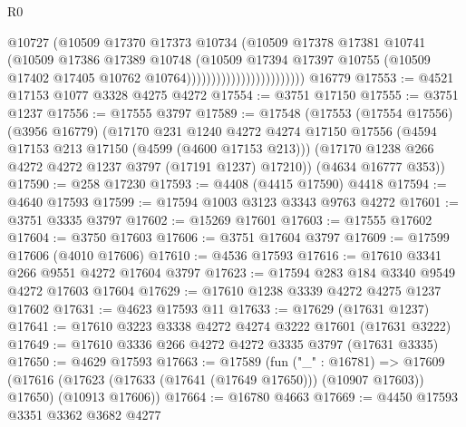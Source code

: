 \begin{lexlean}{R0}
\begin{coremodule}
                                          @10727
                                          (@10509
                                            @17370
                                            @17373
                                            @10734
                                            (@10509
                                              @17378
                                              @17381
                                              @10741
                                              (@10509
                                                @17386
                                                @17389
                                                @10748
                                                (@10509
                                                  @17394
                                                  @17397
                                                  @10755
                                                  (@10509
                                                    @17402
                                                    @17405
                                                    @10762
                                                    @10764))))))))))))))))))))))))
    @16779
@17553 := @4521 @17153 @1077 @3328 @4275 @4272
@17554 := @3751 @17150
@17555 := @3751 @1237
@17556 := @17555 @3797
@17589 := @17548
    (@17553
      (@17554 @17556)
      (@3956 @16779)
      (@17170
        @231
        @1240
        @4272
        @4274
        @17150
        @17556
        (@4594 @17153 @213 @17150 (@4599 (@4600 @17153 @213)))
        (@17170 @1238 @266 @4272 @4272 @1237 @3797 (@17191 @1237) @17210))
      (@4634 @16777 @353))
@17590 := @258 @17230
@17593 := @4408 (@4415 @17590) @4418
@17594 := @4640 @17593
@17599 := @17594 @1003 @3123 @3343 @9763 @4272
@17601 := @3751 @3335 @3797
@17602 := @15269 @17601
@17603 := @17555 @17602
@17604 := @3750 @17603
@17606 := @3751 @17604 @3797
@17609 := @17599 @17606 (@4010 @17606)
@17610 := @4536 @17593
@17616 := @17610 @3341 @266 @9551 @4272 @17604 @3797
@17623 := @17594 @283 @184 @3340 @9549 @4272 @17603 @17604
@17629 := @17610 @1238 @3339 @4272 @4275 @1237 @17602
@17631 := @4623 @17593 @11
@17633 := @17629 (@17631 @1237)
@17641 := @17610 @3223 @3338 @4272 @4274 @3222 @17601 (@17631 @3222)
@17649 := @17610 @3336 @266 @4272 @4272 @3335 @3797 (@17631 @3335)
@17650 := @4629 @17593
@17663 := @17589
    (fun ("_" : @16781) =>
    @17609
      (@17616 (@17623 (@17633 (@17641 (@17649 @17650))) (@10907 @17603)) @17650)
      (@10913 @17606))
@17664 := @16780 @4663
@17669 := @4450 @17593 @3351 @3362 @3682 @4277

\end{coremodule}
\end{lexlean}
